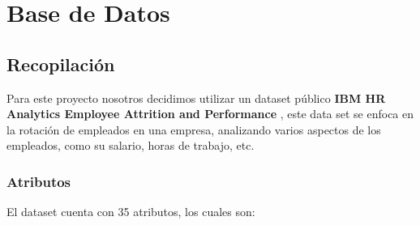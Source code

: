 \newpage
\section{Base de Datos}
\subsection{Recopilación}
Para este proyecto nosotros decidimos utilizar un dataset público
\textbf{IBM HR Analytics Employee Attrition and Performance} \cite{ibm-hr},
este data set se enfoca en la rotación de empleados en una empresa, analizando
varios aspectos de los empleados, como su salario, horas de trabajo, etc.

\subsubsection{Atributos}
El dataset cuenta con 35 atributos, los cuales son:
